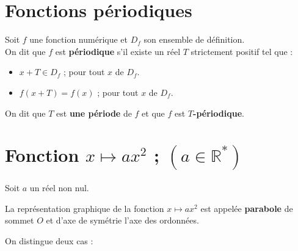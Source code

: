 





\section{Fonctions périodiques }

\begin{Definition}[][]
Soit $f$ une fonction numérique et $D_f$ son ensemble de définition. \\
On dit que $f$ est \textbf{périodique} s'il existe un réel $T$ strictement positif tel que :
\begin{itemize}
    \item $x + T \in D_f$ ; pour tout $x$ de $D_f$.
    \item $f(x + T) = f(x)$ ; pour tout $x$ de $D_f$.
\end{itemize}

On dit que $T$ est \textbf{une période} de $f$ et que $f$ est \textbf{$T$-périodique}.
\end{Definition}









\section{Fonction $x \mapsto ax^2$ ; $(a \in \mathbb{R}^*)$ }





\begin{Definition}[][]
Soit $a$ un réel non nul.

La représentation graphique de la fonction $x \mapsto ax^2$ est appelée
\textbf{parabole} de sommet $O$ et d'axe de symétrie l'axe des ordonnées.
\end{Definition}

\noindent On distingue deux cas :

\vspace{0.2cm}

